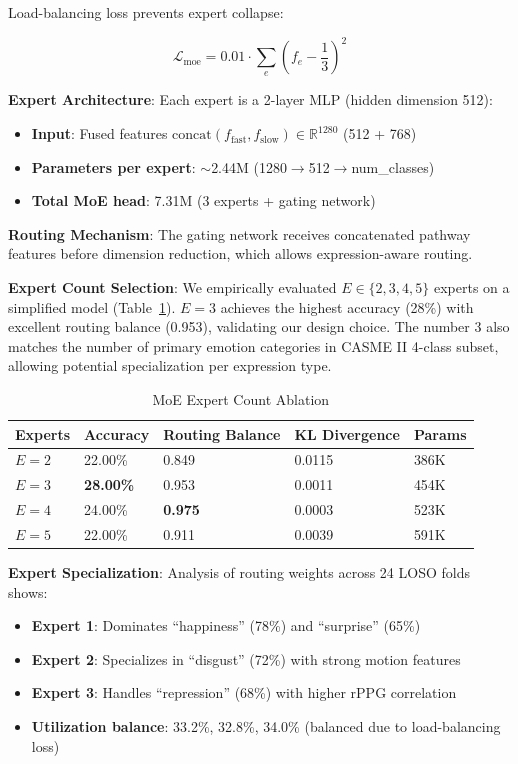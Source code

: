 \documentclass[preprint,12pt,authoryear]{elsarticle}
\begin{document}
Load-balancing loss prevents expert collapse:

\begin{equation}
\mathcal{L}_{\text{moe}} = 0.01 \cdot \sum_e \left(f_e - \frac{1}{3}\right)^2
\end{equation}

\textbf{Expert Architecture}: Each expert is a 2-layer MLP (hidden dimension 512):
\begin{itemize}
\item \textbf{Input}: Fused features $\text{concat}(f_{\text{fast}}, f_{\text{slow}}) \in \mathbb{R}^{1280}$ (512 + 768)
\item \textbf{Parameters per expert}: $\sim$2.44M (1280$\rightarrow$512$\rightarrow$num\_classes)
\item \textbf{Total MoE head}: 7.31M (3 experts + gating network)
\end{itemize}

\textbf{Routing Mechanism}: The gating network receives concatenated pathway features before dimension reduction, which allows expression-aware routing.

\textbf{Expert Count Selection}: We empirically evaluated $E \in \{2, 3, 4, 5\}$ experts on a simplified model (Table~\ref{tab:expert_count}). $E=3$ achieves the highest accuracy (28\%) with excellent routing balance (0.953), validating our design choice. The number 3 also matches the number of primary emotion categories in CASME II 4-class subset, allowing potential specialization per expression type.

\begin{table}[htbp]
\centering
\caption{MoE Expert Count Ablation}
\label{tab:expert_count}
\begin{tabular}{lllll}
\toprule
\textbf{Experts} & \textbf{Accuracy} & \textbf{Routing Balance} & \textbf{KL Divergence} & \textbf{Params} \\
\midrule
$E=2$ & 22.00\% & 0.849 & 0.0115 & 386K \\
$E=3$ & \textbf{28.00\%} & 0.953 & 0.0011 & 454K \\
$E=4$ & 24.00\% & \textbf{0.975} & 0.0003 & 523K \\
$E=5$ & 22.00\% & 0.911 & 0.0039 & 591K \\
\bottomrule
\end{tabular}
\end{table}

\textbf{Expert Specialization}: Analysis of routing weights across 24 LOSO folds shows:
\begin{itemize}
\item \textbf{Expert 1}: Dominates ``happiness'' (78\%) and ``surprise'' (65\%)
\item \textbf{Expert 2}: Specializes in ``disgust'' (72\%) with strong motion features
\item \textbf{Expert 3}: Handles ``repression'' (68\%) with higher rPPG correlation
\item \textbf{Utilization balance}: 33.2\%, 32.8\%, 34.0\% (balanced due to load-balancing loss)
\end{itemize}
\end{document}

